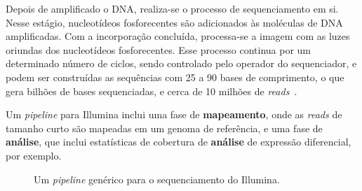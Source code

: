 Depois de amplificado o DNA, realiza-se o processo de sequenciamento em si. Nesse estágio, nucleotídeos fosforecentes são adicionados às moléculas de DNA amplificadas. Com a incorporação concluída, processa-se a imagem com as luzes oriundas dos nucleotídeos fosforecentes. Esse processo continua por um determinado número de ciclos, sendo controlado pelo operador do sequenciador, e podem ser construídas as sequências com 25 a 90 bases de comprimento, o que gera bilhões de bases sequenciadas, e cerca de 10 milhões de \textit{reads}~\citep{dohm2008substantial:2008}.

Um \textit{pipeline} para Illumina inclui uma fase de \textbf{mapeamento}, onde as \textit{reads} de tamanho curto são mapeadas em um genoma de referência, e uma fase de \textbf{análise}, que inclui estatísticas de cobertura de \textbf{análise} de expressão diferencial, por exemplo. 

\begin{figure} [htb!]
\centering
{}
\caption{Um \textit{pipeline} genérico para o sequenciamento do Illumina. \label{fig:pipeline-Illumina}}
\end{figure}

